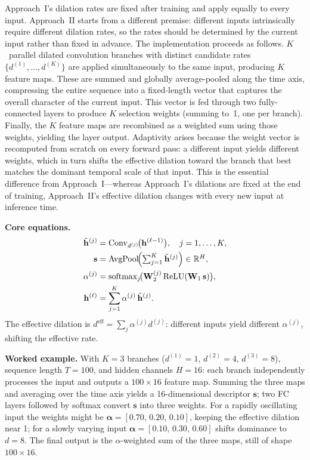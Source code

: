 \documentclass[12pt,a4paper]{article}
\newcommand{\hv}{\mathbf{h}}
\begin{document}
Approach~I's dilation rates are fixed after training and apply equally to every
input. Approach~II starts from a different premise: different inputs intrinsically
require different dilation rates, so the rates should be determined by the current
input rather than fixed in advance. The implementation proceeds as follows.
$K$~parallel dilated convolution branches with distinct candidate rates
$\{d^{(1)},\ldots,d^{(K)}\}$ are applied simultaneously to the same input,
producing $K$ feature maps. These are summed and globally average-pooled along
the time axis, compressing the entire sequence into a fixed-length vector that
captures the overall character of the current input. This vector is fed through
two fully-connected layers to produce $K$ selection weights (summing to~1, one
per branch). Finally, the $K$ feature maps are recombined as a weighted sum
using those weights, yielding the layer output. Adaptivity arises because the
weight vector is recomputed from scratch on every forward pass: a different
input yields different weights, which in turn shifts the effective dilation
toward the branch that best matches the dominant temporal scale of that input.
This is the essential difference from Approach~I---whereas Approach~I's dilations
are fixed at the end of training, Approach~II's effective dilation changes with
every new input at inference time.

\medskip

\noindent\textbf{Core equations.}
\begin{align}
  \tilde{\hv}^{(j)} &= \mathrm{Conv}_{d^{(j)}}\!\bigl(\hv^{(\ell-1)}\bigr),
    \quad j=1,\ldots,K, \label{eq:sk_split}\\
  \mathbf{s} &= \mathrm{AvgPool}\!\Bigl(\textstyle\sum_{j=1}^{K}
    \tilde{\hv}^{(j)}\Bigr)\in\mathbb{R}^{H}, \label{eq:sk_squeeze}\\
  \alpha^{(j)} &= \operatorname{softmax}_{j}\!\bigl(\mathbf{W}_2^{(j)}
    \operatorname{ReLU}(\mathbf{W}_1\,\mathbf{s})\bigr),
    \label{eq:sk_attn}\\
  \hv^{(\ell)} &= \sum_{j=1}^{K} \alpha^{(j)}\,\tilde{\hv}^{(j)}.
    \label{eq:sk_out}
\end{align}
The effective dilation is $d^{\mathrm{eff}} = \sum_j \alpha^{(j)} d^{(j)}$:
different inputs yield different $\alpha^{(j)}$, shifting the effective rate.

\noindent\textbf{Worked example.}\quad
With $K{=}3$ branches ($d^{(1)}{=}1$, $d^{(2)}{=}4$, $d^{(3)}{=}8$),
sequence length $T{=}100$, and hidden channels $H{=}16$: each branch
independently processes the input and outputs a $100\times16$ feature map.
Summing the three maps and averaging over the time axis yields a 16-dimensional
descriptor $\mathbf{s}$; two FC layers followed by softmax convert $\mathbf{s}$
into three weights. For a rapidly oscillating input the weights might be
$\boldsymbol{\alpha}=[0.70,\,0.20,\,0.10]$, keeping the effective dilation near
1; for a slowly varying input $\boldsymbol{\alpha}=[0.10,\,0.30,\,0.60]$ shifts
dominance to $d{=}8$. The final output is the $\alpha$-weighted sum of the three
maps, still of shape $100\times16$.
\end{document}
